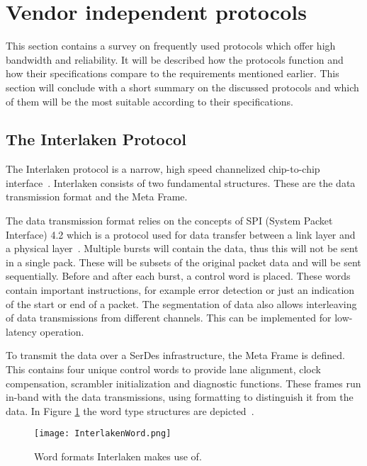 \section{Vendor independent protocols}
\label{sec:survey_standard}
This section contains a survey on frequently used protocols which offer high bandwidth and reliability. It will be described how the protocols function and how their specifications compare to the requirements mentioned earlier. This section will conclude with a short summary on the discussed protocols and which of them will be the most suitable according to their specifications.

\subsection[The Interlaken Protocol]{The Interlaken Protocol}
	The Interlaken protocol is a narrow, high speed channelized chip-to-chip interface~\cite{InterlakenProtocol}. Interlaken consists of two fundamental structures. These are the data transmission format and the Meta Frame.
	
	The data transmission format relies on the concepts of SPI (System Packet Interface) 4.2 which is a protocol used for data transfer between a link layer and a physical layer~\cite{SPI4.2}. Multiple bursts will contain the data, thus this will not be sent in a single pack. These will be subsets of the original packet data and will be sent sequentially. Before and after each burst, a control word is placed. These words contain important instructions, for example error detection or just an indication of the start or end of a packet. The segmentation of data also allows interleaving of data transmissions from different channels. This can be implemented for low-latency operation.
	
	To transmit the data over a SerDes infrastructure, the Meta Frame is defined. This contains four unique control words to provide lane alignment, clock compensation, scrambler initialization and diagnostic functions. These frames run in-band with the data transmissions, using formatting to distinguish it from the data. In Figure \ref{Fig:Interlaken_Words} the word type structures are depicted~\cite{InterlakenProtocol}.
	
	\begin{figure}[ht]
		\centering
		\texttt{[image: InterlakenWord.png]}	
		\caption{Word formats Interlaken makes use of.}
		\label{Fig:Interlaken_Words}
	\end{figure}
	
